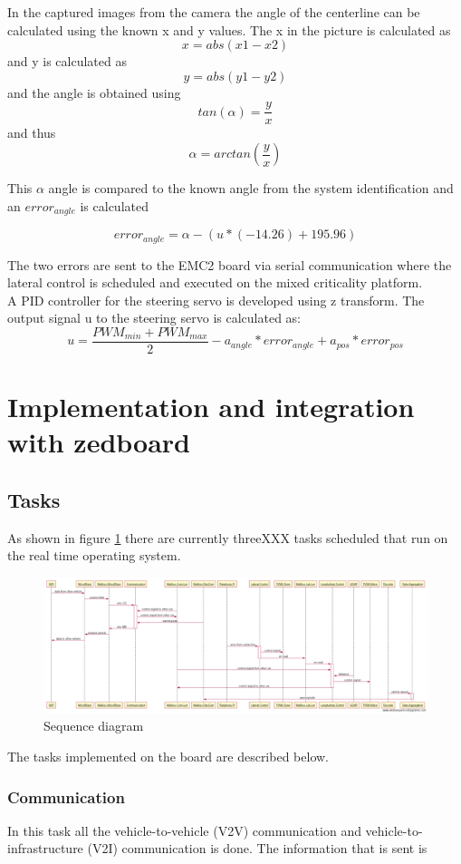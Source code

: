 In the captured images from the camera the angle of the centerline can be calculated using the known x and y values. The x in the picture is calculated as $$x = abs(x1-x2)$$ and y is calculated as $$y=abs(y1-y2)$$ and the angle is obtained using $$tan(\alpha)=\frac{y}{x}$$ and thus $$\alpha = arctan(\frac{y}{x})$$

This $\alpha$ angle is compared to the known angle from the system identification and an $error_{angle}$ is calculated

$$error_{angle} = \alpha - (u*(-14.26)+195.96)$$


The two errors are sent to the EMC2 board via serial communication where the lateral control is scheduled and executed on the mixed criticality platform.\\

A PID controller for the steering servo is developed using z transform. The output signal u to the steering servo is calculated as:
$$u = \frac{PWM_{min}+PWM_{max}}{2} - a_{angle}*error_{angle} + a_{pos}*error_{pos}$$

\section{Implementation and integration with zedboard}
\subsection{Tasks}
As shown in figure \ref{fig:sequence diagram} there are currently threeXXX tasks scheduled that run on the real time operating system.

\begin{figure}[H]
  \includegraphics[width=\textwidth]{./img/sekvensdiagram.png}
  \centering
  \caption{Sequence diagram}
  \label{fig:sequence diagram}
\end{figure}
The tasks implemented on the board are described below.
 
\subsubsection{Communication}
In this task all the vehicle-to-vehicle (V2V) communication and vehicle-to-infrastructure (V2I) communication is done. The information that is sent is

